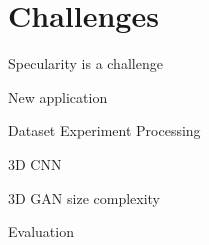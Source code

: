 \section{Challenges}
Specularity is a challenge 

New application

Dataset
	Experiment
	Processing

3D CNN %

3D GAN size complexity

Evaluation



